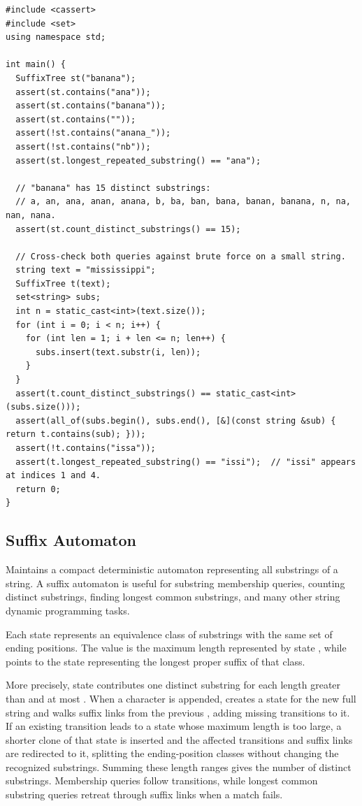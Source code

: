 \begin{lstlisting}[style=cpp]
#include <cassert>
#include <set>
using namespace std;

int main() {
  SuffixTree st("banana");
  assert(st.contains("ana"));
  assert(st.contains("banana"));
  assert(st.contains(""));
  assert(!st.contains("anana_"));
  assert(!st.contains("nb"));
  assert(st.longest_repeated_substring() == "ana");

  // "banana" has 15 distinct substrings:
  // a, an, ana, anan, anana, b, ba, ban, bana, banan, banana, n, na, nan, nana.
  assert(st.count_distinct_substrings() == 15);

  // Cross-check both queries against brute force on a small string.
  string text = "mississippi";
  SuffixTree t(text);
  set<string> subs;
  int n = static_cast<int>(text.size());
  for (int i = 0; i < n; i++) {
    for (int len = 1; i + len <= n; len++) {
      subs.insert(text.substr(i, len));
    }
  }
  assert(t.count_distinct_substrings() == static_cast<int>(subs.size()));
  assert(all_of(subs.begin(), subs.end(), [&](const string &sub) { return t.contains(sub); }));
  assert(!t.contains("issa"));
  assert(t.longest_repeated_substring() == "issi");  // "issi" appears at indices 1 and 4.
  return 0;
}
\end{lstlisting}
\subsection{Suffix Automaton}
\label{sec:3.5.4}
Maintains a compact deterministic automaton representing all substrings of a string. A suffix automaton is useful for substring membership queries, counting distinct substrings, finding longest common substrings, and many other string dynamic programming tasks.

Each state represents an equivalence class of substrings with the same set of ending positions. The value  is the maximum length represented by state , while  points to the state representing the longest proper suffix of that class.

More precisely, state  contributes one distinct substring for each length greater than  and at most . When a character is appended,  creates a state for the new full string and walks suffix links from the previous , adding missing transitions to it. If an existing transition leads to a state whose maximum length is too large, a shorter clone of that state is inserted and the affected transitions and suffix links are redirected to it, splitting the ending-position classes without changing the recognized substrings. Summing these length ranges gives the number of distinct substrings. Membership queries follow transitions, while longest common substring queries retreat through suffix links when a match fails.

